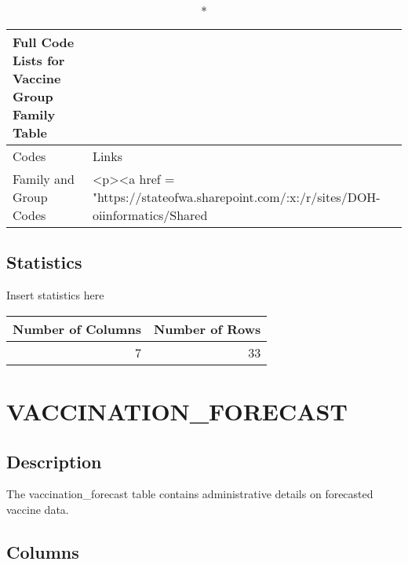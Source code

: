 \documentclass[
  letterpaper,
  DIV=11,
  numbers=noendperiod]{scrreprt}
\begin{document}
\begin{longtable}{ll}
\caption*{
{\large Full Code Lists for Vaccine Group Family Table}
} \\ 
\toprule
Codes & Links \\ 
\midrule
Family and Group Codes & <p><a href = "https://stateofwa.sharepoint.com/:x:/r/sites/DOH-oiinformatics/Shared%
\bottomrule
\end{longtable}

\hypertarget{statistics-42}{%
\section*{Statistics}\label{statistics-42}}

Insert statistics here

\begin{longtable}{rr}
\toprule
Number of Columns & Number of Rows \\ 
\midrule
7 & 33 \\ 
\bottomrule
\end{longtable}

\hypertarget{vaccination_forecast}{%
\chapter*{VACCINATION\_FORECAST}\label{vaccination_forecast}}

\hypertarget{description-43}{%
\section*{Description}\label{description-43}}

The vaccination\_forecast table contains administrative details on
forecasted vaccine data.

\hypertarget{columns-43}{%
\section*{Columns}\label{columns-43}}
\end{document}
